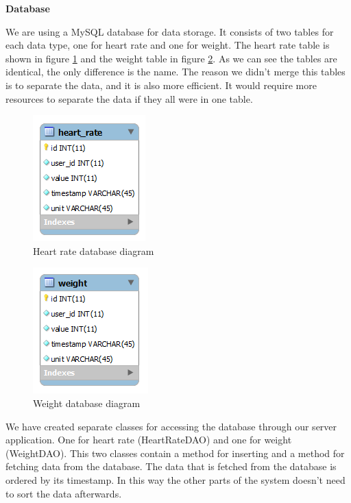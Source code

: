 \textbf{Database}

We are using a MySQL database for data storage.
It consists of two tables for each data type, one for heart rate and one for weight.
The heart rate table is shown in figure \ref{figure:heart-rate-database-diagram} and the weight table in figure \ref{figure:weight-database-diagram}. 
As we can see the tables are identical, the only difference is the name.
The reason we didn't merge this tables is to separate the data, and it is also more efficient.
It would require more resources to separate the data if they all were in one table.

\begin{figure}[h]
\centering
\includegraphics[scale=1.0]{../Figures/heart-rate-database-diagram.png}
\caption{Heart rate database diagram}
\label{figure:heart-rate-database-diagram}
\end{figure}

\begin{figure}[h]
\centering
\includegraphics[scale=1.0]{../Figures/weight-database-diagram.png}
\caption{Weight database diagram}
\label{figure:weight-database-diagram}
\end{figure}

We have created separate classes for accessing the database through our server application.
One for heart rate (HeartRateDAO) and one for weight (WeightDAO).
This two classes contain a method for inserting and a method for fetching data from the database.
The data that is fetched from the database is ordered by its timestamp.
In this way the other parts of the system doesn't need to sort the data afterwards.


